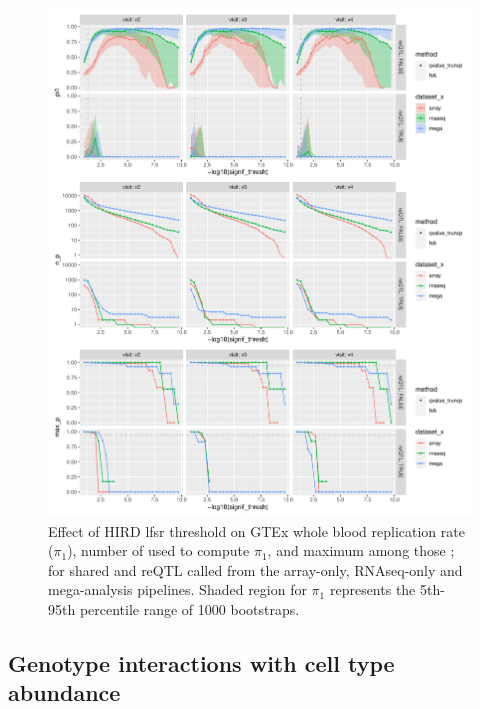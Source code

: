 \begin{figure}
    \centering
    \includegraphics[width=1.0\textwidth,page=1]{mainmatter/figures/chapter_03/compute_pi1.pi1_by_thresholds.pdf}
    \caption{
        Effect of \gls{HIRD} lfsr threshold on GTEx whole blood replication rate ($\pi_1$), number of \pvalues used to compute $\pi_1$, and maximum \pvalue among those \pvalues; 
        for shared and \gls{reQTL} called from the array-only, \gls{RNAseq}-only and mega-analysis pipelines. 
        Shaded region for $\pi_1$ represents the 5th-95th percentile range of 1000 bootstraps.
    }
    \label{fig:hird_eQTL_pi1vsGTExWholeBlood}
\end{figure}

\subsection{Genotype interactions with cell type abundance}

